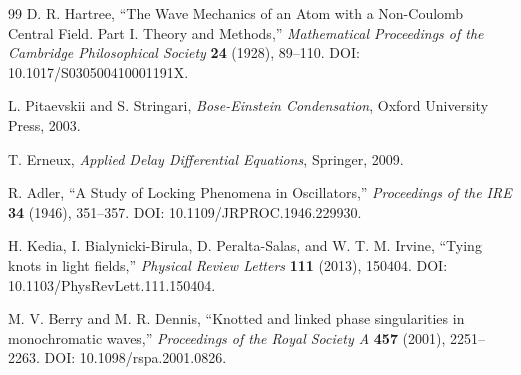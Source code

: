 \documentclass[11pt,a4paper]{article}
\begin{document}
\begin{thebibliography}{99}
D. R. Hartree,
``The Wave Mechanics of an Atom with a Non-Coulomb Central Field. Part I. Theory and Methods,''
\textit{Mathematical Proceedings of the Cambridge Philosophical Society} \textbf{24} (1928), 89--110.
DOI: 10.1017/S030500410001191X.

L. Pitaevskii and S. Stringari,
\textit{Bose-Einstein Condensation},
Oxford University Press, 2003.

T. Erneux,
\textit{Applied Delay Differential Equations},
Springer, 2009.

R. Adler,
``A Study of Locking Phenomena in Oscillators,''
\textit{Proceedings of the IRE} \textbf{34} (1946), 351--357.
DOI: 10.1109/JRPROC.1946.229930.

H. Kedia, I. Bialynicki-Birula, D. Peralta-Salas, and W. T. M. Irvine,
``Tying knots in light fields,''
\textit{Physical Review Letters} \textbf{111} (2013), 150404.
DOI: 10.1103/PhysRevLett.111.150404.

M. V. Berry and M. R. Dennis,
``Knotted and linked phase singularities in monochromatic waves,''
\textit{Proceedings of the Royal Society A} \textbf{457} (2001), 2251--2263.
DOI: 10.1098/rspa.2001.0826.

\end{thebibliography}
\end{document}
